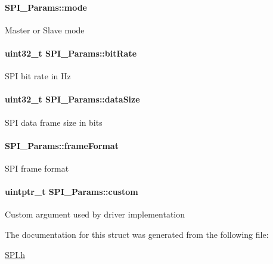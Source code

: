 \paragraph[{mode}]{ S\+P\+I\+\_\+\+Params\+::mode}\label{struct_s_p_i___params_abe5eca64adf4ca96bed206a271d9b157}
Master or Slave mode 
\paragraph[{bit\+Rate}]{\setlength{\rightskip}{0pt plus 5cm}uint32\+\_\+t S\+P\+I\+\_\+\+Params\+::bit\+Rate}\label{struct_s_p_i___params_ab3f035044fdbe75adac8c1d729d8cf20}
S\+P\+I bit rate in Hz 
\paragraph[{data\+Size}]{\setlength{\rightskip}{0pt plus 5cm}uint32\+\_\+t S\+P\+I\+\_\+\+Params\+::data\+Size}\label{struct_s_p_i___params_a30722b1de5e3b089ecf0c669da42ed2d}
S\+P\+I data frame size in bits 
\paragraph[{frame\+Format}]{ S\+P\+I\+\_\+\+Params\+::frame\+Format}\label{struct_s_p_i___params_a67b5ebb8ec72796a0260c427c91cc093}
S\+P\+I frame format 
\paragraph[{custom}]{\setlength{\rightskip}{0pt plus 5cm}uintptr\+\_\+t S\+P\+I\+\_\+\+Params\+::custom}\label{struct_s_p_i___params_a38e4637f2ff1083cc6de3f600632a0da}
Custom argument used by driver implementation 

The documentation for this struct was generated from the following file\+:\begin{DoxyCompactItemize}
\item 
\hyperlink{_s_p_i_8h}{S\+P\+I.\+h}\end{DoxyCompactItemize}
